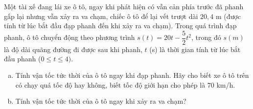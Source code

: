 \begin{baitap}%
	Một tài xế đang lái xe ô tô, ngay khi phát hiện có vẫn cản phía trước đã phanh gấp lại nhưng vẫn xảy ra va chạm, chiếc ô tô để lại vết trượt dài $20{,}4$ m (được tính từ lúc bắt đầu đạp phanh đến khi xảy ra va chạm). Trong quá trình đạp phanh, ô tô chuyển động theo phương trình $s(t)=20t-\dfrac{5}{2}t^2$, trong đó $s(m)$ là độ dài quãng đường đi được sau khi phanh, $t$ (s) là thời gian tính từ lúc bắt đầu phanh ($0\leq t\leq 4)$.
	\begin{enumerate}[a)]
		\item Tính vận tốc tức thời của ô tô ngay khi đạp phanh. Hãy cho biết xe ô tô trên có chạy quá tốc độ hay không, biết tốc độ giới hạn cho phép là $70$ km/h.
		\item Tính vận tốc tức thời của ô tô ngay khi xảy ra va chạm?
	\end{enumerate}
\end{baitap}

